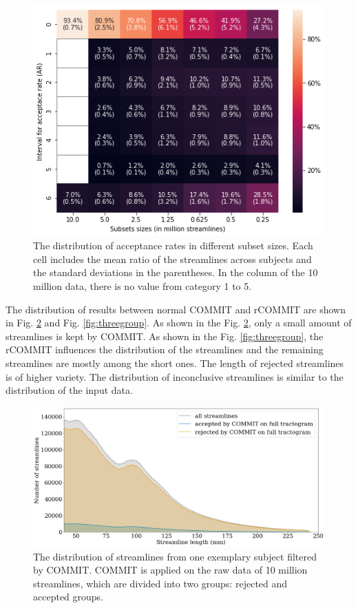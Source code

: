 \begin{figure}[ht]
    \centering
    \includegraphics[width= 12cm]{figures/heatmap.png}
        \caption{The distribution of acceptance rates in different subset sizes. Each cell includes the mean ratio of 
        the streamlines across subjects and the standard deviations in the parentheses. In the column of the 10 million data, there is no value from category 1 to 5.
        }
    \label{fig:heatmap}
\end{figure}

The distribution of results between normal COMMIT and rCOMMIT are shown in Fig. \ref{fig:ori_distri} and Fig. \ref{fig:threegroup}.
As shown in the Fig. \ref{fig:ori_distri}, only a small amount of streamlines is kept by COMMIT. As shown in the Fig. \ref{fig:threegroup}, the rCOMMIT influences the distribution of the streamlines and the remaining 
streamlines are mostly among the short ones. The length of rejected streamlines is of higher variety. The distribution of inconclusive streamlines
is similar to the distribution of the input data.

\begin{figure}[ht]
    \centering
    \includegraphics[width= 12cm]{figures/distributon_origi.png}
        \caption{The distribution of streamlines from one exemplary subject filtered by COMMIT. COMMIT is applied on the raw data of 10 million streamlines, which are 
        divided into two groups: rejected and accepted groups.}
    \label{fig:ori_distri}
\end{figure}

